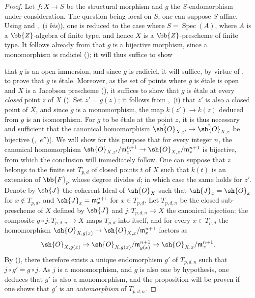 \begin{proof}
Let $f:X\to S$ be the structural morphism and $g$ the $S$-endomorphism under consideration.
The question being local on $S$, one can suppose $S$ affine.
Using  and ,~(i \emph{bis})), one is reduced to the case where $S=\operatorname{Spec}(A)$, where $A$ is a $\bb{Z}$-algebra of finite type, and hence $X$ is a $\bb{Z}$-prescheme of finite type.
It follows already from  that $g$ is a bijective morphism, since a monomorphism is radiciel (); it will thus suffice to show


that $g$ is an open immersion, and since $g$ is radiciel, it will suffice, by virtue of , to prove that $g$ is \'etale.
Moreover, as the set of points where $g$ is \'etale is open and $X$ is a Jacobson prescheme (), it suffices to show that $g$ is \'etale at every \emph{closed} point $z$ of $X$ ().
Set $z'=g(z)$; it follows from ,~(i) that $z'$ is also a closed point of $X$, and since $g$ is a monomorphism, the map $k(z')\to k(z)$ deduced from $g$ is an isomorphism.
For $g$ to be \'etale at the point $z$, it is thus necessary and sufficient that the canonical homomorphism $\hat{\sh{O}}_{X,z'}\to\hat{\sh{O}}_{X,z}$ be bijective (,~$e''$)).
We will show for this purpose that for every integer $n$, the canonical homomorphism $\sh{O}_{X,z'}/\mathfrak{m}_{z'}^{n+1}\to\sh{O}_{X,z}/\mathfrak{m}_z^{n+1}$ is bijective, from which the conclusion will immediately follow.
One can suppose that $z$ belongs to the finite set $T_{p,d}$ of closed points $t$ of $X$ such that $k(t)$ is an extension of $\bb{F}_p$ whose degree divides $d$; in which case the same holds for $z'$.
Denote by $\sh{J}$ the coherent Ideal of $\sh{O}_X$ such that $\sh{J}_x=\sh{O}_x$ for $x\notin T_{p,d}$, and $\sh{J}_x=\mathfrak{m}_x^{n+1}$ for $x\in T_{p,d}$.
Let $T_{p,d,n}$ be the closed sub-prescheme of $X$ defined by $\sh{J}$ and $j:T_{p,d,n}\to X$ the canonical injection; the composite $g\circ j:T_{p,d,n}\to X$ maps $T_{p,d}$ into itself, and for every $x\in T_{p,d}$ the homomorphism $\sh{O}_{X,g(x)}\to\sh{O}_{X,x}/\mathfrak{m}_x^{n+1}$ factors as
\[
  \sh{O}_{X,g(x)} \to \sh{O}_{X,g(x)}/\mathfrak{m}_{g(x)}^{n+1} \to \sh{O}_{X,x}/\mathfrak{m}_x^{n+1}.
\]
By (), there therefore exists a unique endomorphism $g'$ of $T_{p,d,n}$ such that $j\circ g'=g\circ j$.
As $j$ is a monomorphism, and $g$ is also one by hypothesis, one deduces that $g'$ is also a monomorphism, and the proposition will be proven if one shows that $g'$ is an \emph{automorphism} of $T_{p,d,n}$.

\end{proof}
